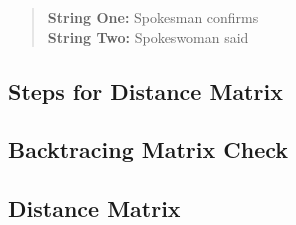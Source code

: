 
\begin{quote}
\textbf{String One: } Spokesman confirms \\
\textbf{String Two: } Spokeswoman said
\end{quote}
\subsection{Steps for Distance Matrix}
\subsection{Backtracing Matrix Check}
\subsection{Distance Matrix}